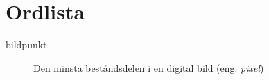 \documentclass[rapport_MVEX01-11-05]{subfiles}
\begin{document}
\section*{Ordlista}
\begin{description}
    \item[bildpunkt] Den minsta beståndsdelen i en digital bild (eng. \emph{pixel})
\end{description}
\end{document}
